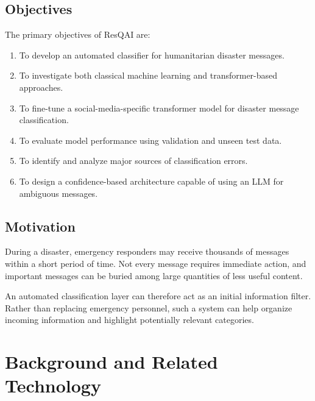 \documentclass[12pt,a4paper]{article}
\begin{document}
\subsection{Objectives}

The primary objectives of ResQAI are:

\begin{enumerate}
    \item To develop an automated classifier for humanitarian disaster
    messages.
    
    \item To investigate both classical machine learning and transformer-based
    approaches.
    
    \item To fine-tune a social-media-specific transformer model for disaster
    message classification.
    
    \item To evaluate model performance using validation and unseen test data.
    
    \item To identify and analyze major sources of classification errors.
    
    \item To design a confidence-based architecture capable of using an LLM
    for ambiguous messages.
\end{enumerate}

\subsection{Motivation}

During a disaster, emergency responders may receive thousands of messages
within a short period of time. Not every message requires immediate action,
and important messages can be buried among large quantities of less useful
content.

An automated classification layer can therefore act as an initial information
filter. Rather than replacing emergency personnel, such a system can help
organize incoming information and highlight potentially relevant categories.

\section{Background and Related Technology}
\end{document}
